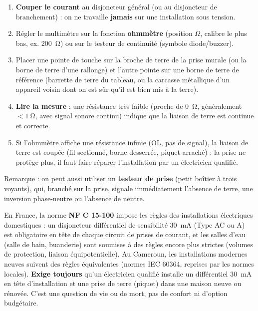 \documentclass[11pt]{article}
\begin{document}
\begin{methode}
\begin{enumerate}
\item \textbf{Couper le courant} au disjoncteur général (ou au disjoncteur de branchement) : on ne travaille \textbf{jamais} sur une installation sous tension.
\item Régler le multimètre sur la fonction \textbf{ohmmètre} (position $\Omega$, calibre le plus bas, ex. \SI{200}{\ohm}) ou sur le testeur de continuité (symbole diode/buzzer).
\item Placer une pointe de touche sur la broche de terre de la prise murale (ou la borne de terre d'une rallonge) et l'autre pointe sur une borne de terre de référence (barrette de terre du tableau, ou la carcasse métallique d'un appareil voisin dont on est sûr qu'il est bien mis à la terre).
\item \textbf{Lire la mesure} : une résistance très faible (proche de \SI{0}{\ohm}, généralement $< \SI{1}{\ohm}$, avec signal sonore continu) indique que la liaison de terre est continue et correcte.
\item Si l'ohmmètre affiche une résistance infinie (OL, pas de signal), la liaison de terre est coupée (fil sectionné, borne desserrée, piquet arraché) : la prise ne protège plus, il faut faire réparer l'installation par un électricien qualifié.
\end{enumerate}
Remarque : on peut aussi utiliser un \textbf{testeur de prise} (petit boîtier à trois voyants), qui, branché sur la prise, signale immédiatement l'absence de terre, une inversion phase-neutre ou l'absence de neutre.
\end{methode}

\begin{savaistu}
En France, la norme \textbf{NF C 15-100} impose les règles des installations électriques domestiques : un disjoncteur différentiel de sensibilité \SI{30}{mA} (Type AC ou A) est obligatoire en tête de chaque circuit de prises de courant, et les salles d'eau (salle de bain, buanderie) sont soumises à des règles encore plus strictes (volumes de protection, liaison équipotentielle). Au Cameroun, les installations modernes neuves suivent des règles équivalentes (normes IEC 60364, reprises par les normes locales). \textbf{Exige toujours} qu'un électricien qualifié installe un différentiel \SI{30}{mA} en tête d'installation et une prise de terre (piquet) dans une maison neuve ou rénovée. C'est une question de vie ou de mort, pas de confort ni d'option budgétaire.
\end{savaistu}
\end{document}
